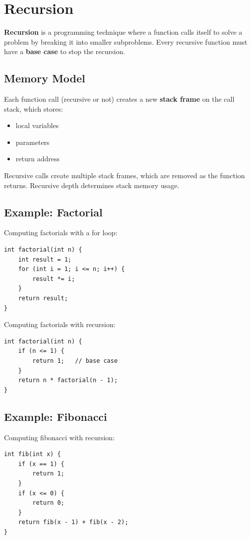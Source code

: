 \section{Recursion}

\textbf{Recursion} is a programming technique where a function calls itself to solve a problem by breaking it into smaller subproblems.  
Every recursive function must have a \textbf{base case} to stop the recursion.

\subsection{Memory Model}
Each function call (recursive or not) creates a new \textbf{stack frame} on the call stack, which stores:
\begin{itemize}
  \item local variables
  \item parameters
  \item return address
\end{itemize}
Recursive calls create multiple stack frames, which are removed as the function returns. Recursive depth determines stack memory usage.

\subsection{Example: Factorial}

Computing factorials with a for loop:
\begin{verbatim}
int factorial(int n) {
    int result = 1;
    for (int i = 1; i <= n; i++) {
        result *= i;
    }
    return result;
}
\end{verbatim}
Computing factorials with recursion:
\begin{verbatim}
int factorial(int n) {
    if (n <= 1) {
        return 1;   // base case
    }
    return n * factorial(n - 1);
}
\end{verbatim}

\subsection{Example: Fibonacci}
Computing fibonacci with recursion:
\begin{verbatim}
int fib(int x) {
    if (x == 1) {
        return 1;
    }
    if (x <= 0) {
        return 0;
    }
    return fib(x - 1) + fib(x - 2);
}
\end{verbatim}
